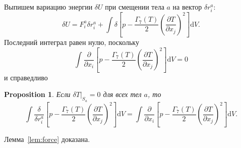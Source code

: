 \documentclass{article}
\theoremstyle{plain}
\newtheorem{proposition}{Proposition}
\newcommand{\dd}{\mathrm{d}}
\newcommand{\pder}[2][]{\frac{\partial#1}{\partial#2}}
\begin{document}
Выпишем вариацию энергии \(\delta{U}\) при смещении тела \(a\) на вектор \(\delta r^a_i\):
\begin{equation}\label{eq:variation_ell}
    \delta U = F^a_i\delta r^a_i +
        \int \delta\left[ p - \frac{\Gamma_7(T)}2\left(\pder[T]{x_j}\right)^2 \right]\dd{V}.
\end{equation}
Последний интеграл равен нулю, поскольку
\begin{equation}\label{eq:sum_forces}
    \int \pder{x_i} \left[ p - \frac{\Gamma_7(T)}2\left(\pder[T]{x_j}\right)^2 \right]\dd{V} = 0
\end{equation}
и справедливо
\begin{proposition}
    Если \(\delta T|_{S_a} = 0\) для всех тел \(a\), то
    \begin{equation}\label{eq:delta_to_partial}
        \int \frac{\delta}{\delta r^a_i} \left[ p - \frac{\Gamma_7(T)}2\left(\pder[T]{x_j}\right)^2 \right]\dd{V} =
        \int \pder{x_i} \left[ p - \frac{\Gamma_7(T)}2\left(\pder[T]{x_j}\right)^2 \right]\dd{V}.
    \end{equation}
\end{proposition}
Лемма~\ref{lem:force} доказана.
\end{document}
